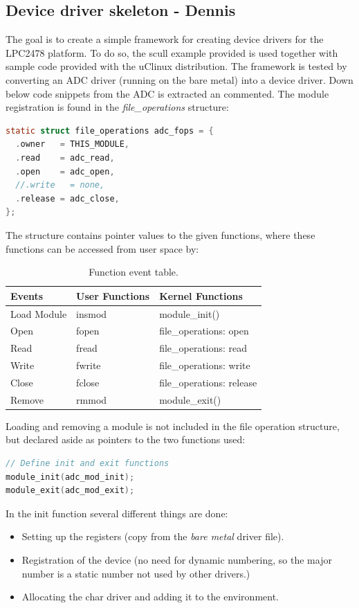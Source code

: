 \subsection{Device driver skeleton - Dennis}
The goal is to create a simple framework for creating device drivers for the LPC2478 platform. To do so, the scull example provided is used together with sample code provided with the uClinux distribution. The framework is tested by converting an ADC driver (running on the bare metal) into a device driver. Down below code snippets from the ADC is extracted an commented. 
\p The module registration is found in the \textit{file\_operations} structure:
\begin{lstlisting}[language=c]
static struct file_operations adc_fops = {
  .owner   = THIS_MODULE,
  .read    = adc_read,
  .open    = adc_open,
  //.write   = none,
  .release = adc_close,
};
\end{lstlisting}

The structure contains pointer values to the given functions, where these functions can be accessed from user space by:
\begin{table}[H]
	\centering
	\begin{tabular}{|l|l|l|}
		\hline
			Events		& User Functions & Kernel Functions \\ \hline
			Load Module 	& insmod	& module\_init()		 \\ 
			Open		& fopen	& file\_operations: open	 \\ 
			Read		& fread	& file\_operations: read	 \\ 
			Write			& fwrite 	& file\_operations: write	 \\ 
			Close		& fclose 	& file\_operations: release\\ 
			Remove		& rmmod 	& module\_exit()		 \\
		\hline
	\end{tabular}
	\caption{Function event table.}
\end{table}
Loading and removing a module is not included in the file operation structure, but declared aside as pointers to the two functions used:
\begin{lstlisting}[language=c]
// Define init and exit functions
module_init(adc_mod_init);
module_exit(adc_mod_exit);
\end{lstlisting}

In the init function several different things are done:
\begin{itemize}
	\item Setting up the registers (copy from the \textit{bare metal} driver file).
	\item Registration of the device (no need for dynamic numbering, so the major number is a static number not used by other drivers.)
	\item Allocating the char driver and adding it to the environment.
\end{itemize}

